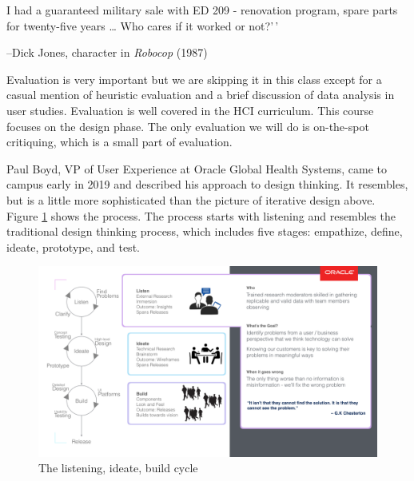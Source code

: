 \noindent {}I had a guaranteed military sale with ED 209 -
renovation program, spare parts for twenty-five years \ldots{} Who cares
if it worked or not?'\,'

\hfill--Dick Jones, character in \emph{Robocop} (1987)

Evaluation is very important but we are skipping it in this class except
for a casual mention of heuristic evaluation and a brief discussion of
data analysis in user studies. Evaluation is well covered in the HCI
curriculum. This course focuses on the design phase. The only evaluation
we will do is on-the-spot critiquing, which is a small part of
evaluation.

\hypertarget{another-perspective-on-iteration}{%
\label{another-perspective-on-iteration}}

Paul Boyd, VP of User Experience at Oracle Global Health Systems, came
to campus early in 2019 and described his approach to design thinking.
It resembles, but is a little more sophisticated than the picture of
iterative design above. Figure \ref{fiListening} shows the process. The
process starts with listening and resembles the traditional design
thinking process, which includes five stages: empathize, define, ideate,
prototype, and test.

\begin{figure}
  \begin{center}
    \includegraphics{fiListening.png}
  \caption{The listening, ideate, build cycle}
  \label{fiListening}
  \end{center}
\end{figure}

\hypertarget{fidelity-of-prototyping}{%
\label{fidelity-of-prototyping}}

